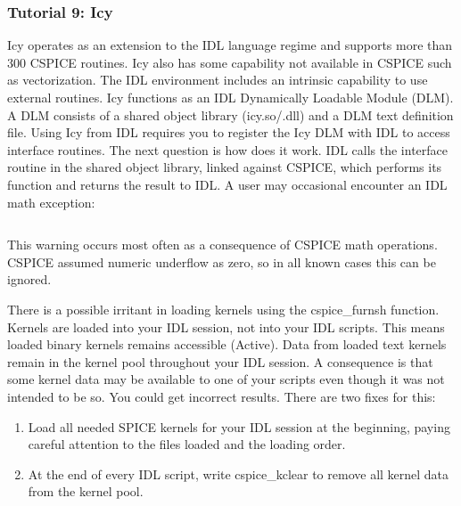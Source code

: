 \documentclass[crop=false,class=book]{standalone}
\begin{document}
            \subsubsection{Tutorial 9: Icy}
            Icy operates as an extension to the IDL language regime and supports more than 300 CSPICE routines. Icy also has some capability not available in CSPICE such as vectorization. The IDL environment includes an intrinsic capability to use external routines. Icy functions as an IDL Dynamically Loadable Module (DLM). A DLM consists of a shared object library (icy.so/.dll) and a DLM text definition file. Using Icy from IDL requires you to register the Icy DLM with IDL to access interface routines. The next question is how does it work. IDL calls the interface routine in the shared object library, linked against CSPICE, which performs its function and returns the result to IDL. A user may occasional encounter an IDL math exception:
            \begin{lstlisting}[language=bash,basicstyle=\footnotesize]
            % Program caused arithmetic error: Floating underflow
            \end{lstlisting}
            This warning occurs most often as a consequence of CSPICE math operations. CSPICE assumed numeric underflow as zero, so in all known cases this can be ignored.
            \begin{remark}
            There is a possible irritant in loading kernels using the cspice\_furnsh function. Kernels are loaded into your IDL session, not into your IDL scripts. This means loaded binary kernels remains accessible (Active). Data from loaded text kernels remain in the kernel pool throughout your IDL session. A consequence is that some kernel data may be available to one of your scripts even though it was not intended to be so. You could get incorrect results. There are two fixes for this:
            \begin{enumerate}
                \item Load all needed SPICE kernels for your IDL session at the beginning, paying careful attention to the files loaded and the loading order.
                \item At the end of every IDL script, write cspice\_kclear to remove all kernel data from the kernel pool.
            \end{enumerate}
            \end{remark}
\end{document}
